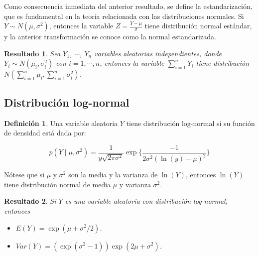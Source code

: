 \documentclass[
  10pt,
  spanish,
]{book}
\providecommand{\tightlist}{%
  \setlength{\itemsep}{0pt}\setlength{\parskip}{0pt}}
\newtheorem{proposition}{Resultado}[chapter]
\theoremstyle{definition}
\newtheorem{definition}{Definición}[chapter]
\theoremstyle{definition}
\theoremstyle{definition}
\theoremstyle{definition}
\theoremstyle{remark}
\begin{document}
Como consecuencia inmediata del anterior resultado, se define la estandarización, que es fundamental en la teoría relacionada con las distribuciones normales. Si \(Y\sim N(\mu,\sigma^2)\), entonces la variable \(Z=\frac{Y-\mu}{\sigma}\) tiene distribución normal estándar, y la anterior transformación se conoce como la normal estandarizada.

\begin{proposition}
\protect\hypertarget{prp:unnamed-chunk-36}{}{\label{prp:unnamed-chunk-36} }Sea \(Y_1\), \(\cdots\), \(Y_n\) variables aleatorias independientes, donde \(Y_i\sim N(\mu_i,\sigma^2_i)\) con \(i=1,\cdots,n\), entonces la variable \(\sum_{i=1}^nY_i\) tiene distribución \(N(\sum_{i=1}^n\mu_i,\sum_{i=1}^n\sigma_i^2)\).
\end{proposition}

\hypertarget{distribuciuxf3n-log-normal}{%
\subsection{Distribución log-normal}\label{distribuciuxf3n-log-normal}}

\begin{definition}
\protect\hypertarget{def:unnamed-chunk-37}{}{\label{def:unnamed-chunk-37} }Una variable aleatoria \(Y\) tiene distribución log-normal si su función de densidad está dada por:

\begin{equation}
p(Y\mid \mu, \sigma^2)=\frac{1}{y\sqrt{2\pi\sigma^2}}\exp\{\frac{-1}{2\sigma^2(\ln(y)-\mu)^2}\}
\end{equation}

Nótese que si \(\mu\) y \(\sigma^2\) son la media y la varianza de \(\ln(Y)\), entonces \(\ln(Y)\) tiene distribución normal de media \(\mu\) y varianza \(\sigma^2\).
\end{definition}

\begin{proposition}
\protect\hypertarget{prp:unnamed-chunk-38}{}{\label{prp:unnamed-chunk-38} }Si \(Y\) es una variable aleatoria con distribución log-normal, entonces

\begin{itemize}
\tightlist
\item
  \(E(Y)=\exp(\mu+\sigma^2/2)\).
\item
  \(Var(Y)=(\exp(\sigma^2-1)) \exp(2\mu+\sigma^2)\).
\end{itemize}
\end{proposition}
\end{document}
